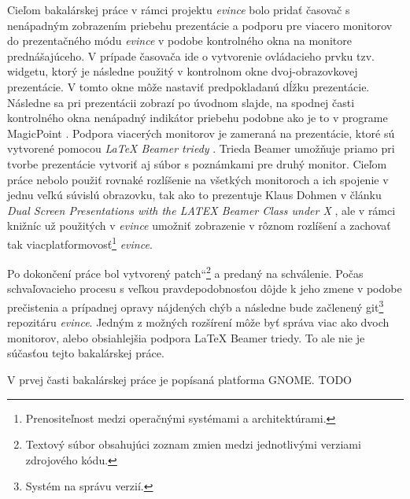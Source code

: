 \documentclass[12pt,oneside,final]{fithesis2}
\newcommand\uv[1]{\quotedblbase #1\textquotedblleft}%
\begin{document}
 Cieľom bakalárskej práce v rámci projektu \emph{evince} bolo pridať časovač s nenápadným zobrazením priebehu prezentácie a podporu pre viacero monitorov do prezentačného módu \emph{evince} v podobe kontrolného okna na monitore prednášajúceho. V prípade časovača ide o vytvorenie ovládacieho prvku tzv. widgetu, ktorý je následne použitý v kontrolnom okne dvoj-obrazovkovej prezentácie. V tomto okne môže nastaviť predpokladanú dĺžku prezentácie. Následne sa pri prezentácii zobrazí po úvodnom slajde, na spodnej časti kontrolného okna nenápadný indikátor priebehu podobne ako je to v programe MagicPoint \cite{mgp}. Podpora viacerých monitorov je zameraná na prezentácie, ktoré sú vytvorené pomocou \emph{LaTeX Beamer triedy} \cite{beamer}. Trieda Beamer umožňuje priamo pri tvorbe prezentácie vytvoriť aj súbor s poznámkami pre druhý monitor.
 Cieľom práce nebolo použiť rovnaké rozlíšenie na všetkých monitoroch a ich spojenie v jednu veľkú súvislú obrazovku, tak ako to prezentuje Klaus Dohmen v článku \emph{Dual Screen Presentations with the LATEX Beamer Class under X} \cite{dohmen}, ale v rámci knižníc už použitých v \emph{evince} umožniť zobrazenie v rôznom rozlíšení a zachovať tak viacplatformovosť\footnote{Prenositeľnost medzi operačnými systémami a architektúrami.} \emph{evince}.
 
 Po dokončení práce bol vytvorený \uv{patch}\footnote{Textový súbor obsahujúci zoznam zmien medzi jednotlivými verziami zdrojového kódu.} a predaný na schválenie. Počas schvaľovacieho procesu s veľkou pravdepodobnosťou dôjde k jeho zmene v podobe prečistenia a prípadnej opravy nájdených chýb a následne bude začlenený git\footnote{Systém na správu verzií.} repozitáru \emph{evince}. Jedným z možných rozšírení môže byť správa viac ako dvoch monitorov, alebo obsiahlejšia podpora LaTeX Beamer triedy. To ale nie je súčasťou tejto bakalárskej práce.
 
 V prvej časti bakalárskej práce je popísaná platforma GNOME. TODO %
 
\end{document}
